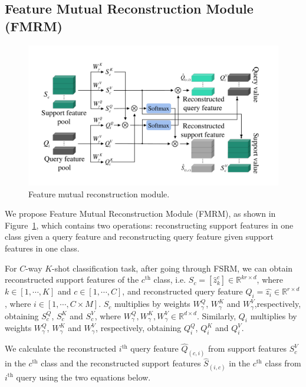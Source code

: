 \documentclass[letterpaper]{article} %
\begin{document}
\subsection{Feature Mutual Reconstruction Module (FMRM)}
\begin{figure}[ht]
  \centering
  \includegraphics[width=0.8\linewidth]{figures/3.3.pdf}
  \caption{Feature mutual reconstruction module.}
  \label{fig:3.3}
\end{figure}







We propose Feature Mutual Reconstruction Module (FMRM), as shown in Figure~\ref{fig:3.3}, which contains two operations:
reconstructing support features in one class given a query feature and reconstructing query feature given support features in one class.



For $C$-way $K$-shot classification task, after going through FSRM, we can obtain reconstructed support features of the $c^\text{th}$ class, i.e. $S_c = [\hat{z}_k^c] \in \mathbb{R}^{kr\times d} $, where $k \in [1,\cdots, K]$ {and $c \in [1,\cdots, C]$}, and reconstructed query feature $Q_i =\hat{z_i} \in \mathbb{R}^{r\times d}$, where
$i \in [1,\cdots, C\times M]$.
$S_c$ multiplies by weights $W_{\gamma}^Q$, $W_{\gamma}^K$ and $W_{\gamma}^V$,respectively, obtaining $S_c^Q$, $S_c^K$ and $S_c^V$, where $W_{\gamma}^Q, W_{\gamma}^K, W_{\gamma}^V \in \mathbb{R}^{d\times d}$. Similarly, $Q_i$ multiplies by weights $W_{\gamma}^Q$, $W_{\gamma}^K$ and $W_{\gamma}^V$, respectively, obtaining $Q_i^Q$, $Q_i^K$ and $Q_i^V$.








We calculate the reconstructed $i^\text{th}$ query feature $\hat{Q}_{(c,i)}$ from {support features $S_c^V$ in the $c^\text{th}$ class and the reconstructed support features $\hat{S}_{(i,c)}$ in the $c^\text{th}$ class} from $i^\text{th}$ query using the two equations below.
\end{document}
